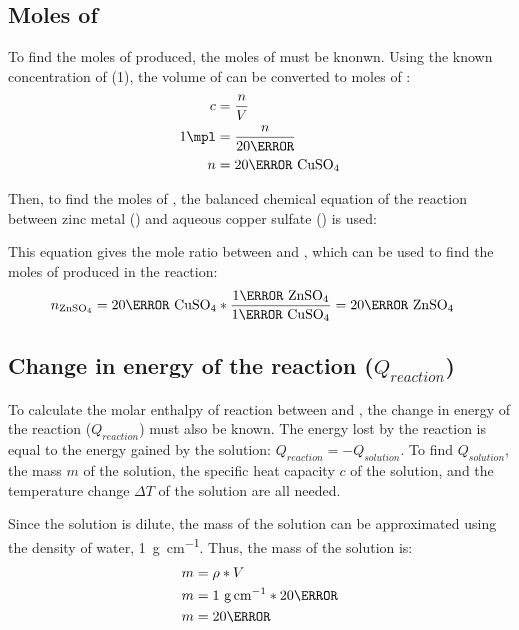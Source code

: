 \documentclass[12pt, notitlepage, letterpaper]{report}
\begin{document}
\subsection*{Moles of }

To find the moles of  produced, the moles of  must be knonwn. Using the known concentration of  (1\mpl), the volume of  can be converted to moles of :
\begin{align*}
	c     & = \frac{n}{V}        \\
	1\mpl & = \frac{n}{20\ml}    \\
	n     & = 20\mmol~\ce{CuSO4}
\end{align*}

Then, to find the moles of , the balanced chemical equation of the reaction between zinc metal () and aqueous copper sulfate () is used:

\centerline{}

This equation gives the mole ratio between  and , which can be used to find the moles of  produced in the reaction:
\begin{align*}
	n_{\ce{ZnSO4}} & = 20\mmol~\ce{CuSO4} * \frac{1\mol~{\ce{ZnSO4}}}{1\mol~{\ce{CuSO4}}} = 20\mmol~{\ce{ZnSO4}}
\end{align*}

\subsection*{Change in energy of the reaction ($Q_{reaction}$)}

To calculate the molar enthalpy of reaction between  and , the change in energy of the reaction ($Q_{reaction}$) must also be known. The energy lost by the reaction is equal to the energy gained by the solution: $Q_{reaction} = -Q_{solution}$. To find $Q_{solution}$, the mass $m$ of the solution, the specific heat capacity $c$ of the solution, and the temperature change $\Delta T$ of the solution are all needed.

Since the solution is dilute, the mass of the solution can be approximated using the density of water, 1~\unit{\gram\per\cm}. Thus, the mass of the solution is:
\begin{align*}
	m & = \rho * V                      \\
	m & = 1~\unit{\gram\per\cm} * 20\ml \\
	m & = 20\gram
\end{align*}
\end{document}
